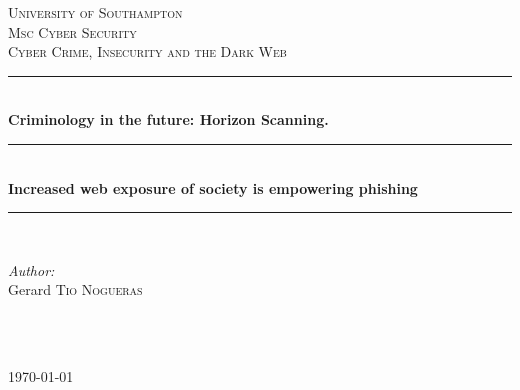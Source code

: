 \documentclass[12pt]{article} %
\begin{document}

\begin{titlepage}

\newcommand{\HRule}{\rule{\linewidth}{0.5mm}} %

\center %

\textsc{\LARGE University of Southampton}\\[1.5cm] %
\textsc{\Large Msc Cyber Security}\\[0.5cm] %
\textsc{\large Cyber Crime, Insecurity and the Dark Web}\\[0.5cm] %

\HRule \\[0.4cm]
{ \huge \bfseries Criminology in the future: Horizon Scanning.}\\[0.4cm]

\HRule \\[0.4cm]
{\huge \bfseries Increased web exposure of society is empowering phishing}
\\[0.4cm] %
\HRule \\[1.5cm]

\begin{minipage}{0.4\textwidth}
\begin{flushleft} \large
\emph{Author:}\\
Gerard \textsc{Tio Nogueras} %
\end{flushleft}
\end{minipage}
~
\begin{minipage}{0.4\textwidth}
\begin{flushright} \large

\end{flushright}
\end{minipage}\\[4cm]

{\large \today}\\[3cm] %


\vfill %
\end{titlepage}
\end{document}
